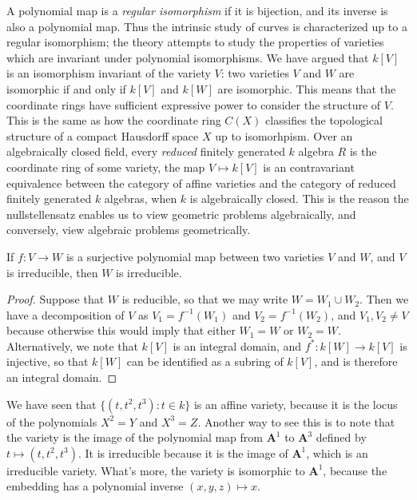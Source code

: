 A polynomial map is a \emph{regular isomorphism} if it is bijection, and its inverse is also a polynomial map. Thus the intrinsic study of curves is characterized up to a regular isomorphism; the theory attempts to study the properties of varieties which are invariant under polynomial isomorphisms. We have argued that $k[V]$ is an isomorphism invariant of the variety $V$: two varieties $V$ and $W$ are isomorphic if and only if $k[V]$ and $k[W]$ are isomorphic. This means that the coordinate rings have sufficient expressive power to consider the structure of $V$. This is the same as how the coordinate ring $C(X)$ classifies the topological structure of a compact Hausdorff space $X$ up to isomorhpism. Over an algebraically closed field, every \emph{reduced} finitely generated $k$ algebra $R$ is the coordinate ring of some variety, the map $V \mapsto k[V]$ is an contravariant equivalence between the category of affine varieties and the category of reduced finitely generated $k$ algebras, when $k$ is algebraically closed. This is the reason the nullstellensatz enables us to view geometric problems algebraically, and conversely, view algebraic problems geometrically.

\begin{prop}
    If $f: V \to W$ is a surjective polynomial map between two varieties $V$ and $W$, and $V$ is irreducible, then $W$ is irreducible.
\end{prop}
\begin{proof}
    Suppose that $W$ is reducible, so that we may write $W = W_1 \cup W_2$. Then we have a decomposition of $V$ as $V_1 = f^{-1}(W_1)$ and $V_2 = f^{-1}(W_2)$, and $V_1, V_2 \neq V$ because otherwise this would imply that either $W_1 = W$ or $W_2 = W$. Alternatively, we note that $k[V]$ is an integral domain, and $f^*: k[W] \to k[V]$ is injective, so that $k[W]$ can be identified as a subring of $k[V]$, and is therefore an integral domain.
\end{proof}

\begin{example}
    We have seen that $\{ (t,t^2,t^3): t \in k \}$ is an affine variety, because it is the locus of the polynomials $X^2 = Y$ and $X^3 = Z$. Another way to see this is to note that the variety is the image of the polynomial map from $\mathbf{A}^1$ to $\mathbf{A}^3$ defined by $t \mapsto (t,t^2,t^3)$. It is irreducible because it is the image of $\mathbf{A}^1$, which is an irreducible variety. What's more, the variety is isomorphic to $\mathbf{A}^1$, because the embedding has a polynomial inverse $(x,y,z) \mapsto x$.
\end{example}

